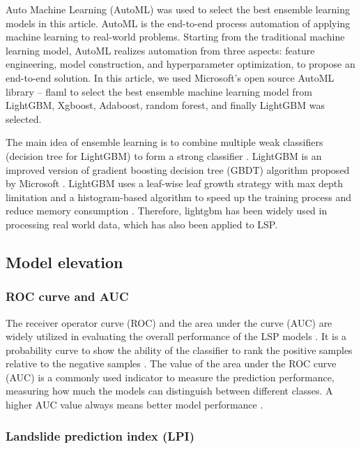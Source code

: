 \documentclass[a4paper,fleqn]{cas-sc}
\begin{document}
Auto Machine Learning (AutoML) was used to select the best ensemble learning models in this article.
AutoML is the end-to-end process automation of applying machine learning to real-world problems.
Starting from the traditional machine learning model, AutoML realizes automation from three aspects: feature engineering, model construction, and hyperparameter optimization, to propose an end-to-end solution.
In this article, we used Microsoft's open source AutoML library -- flaml to select the best ensemble machine learning model from LightGBM, Xgboost, Adaboost, random forest, and finally LightGBM was selected.


The main idea of ensemble learning is to combine multiple weak classifiers (decision tree for LightGBM) to form a strong classifier \citep{Song2018}. 
LightGBM is an improved version of gradient boosting decision tree (GBDT) algorithm proposed by Microsoft \citep{ke2017lightgbm}. 
LightGBM uses a leaf-wise leaf growth strategy with max depth limitation and a histogram-based algorithm to speed up the training process and reduce memory consumption \citep{Gao2021}. 
Therefore, lightgbm has been widely used in processing real world data, which has also been applied to LSP\citep{Song2018,Zhang2022}.

\subsection{Model elevation}
\subsubsection{ROC curve and AUC}

The receiver operator curve (ROC) and the area under the curve (AUC) are widely utilized in evaluating the overall performance of the LSP models \citep{Zhao2021, Gao2021}.
It is a probability curve to show the ability of the classifier to rank the positive samples relative to the negative samples \citep{Gao2021}.
The value of the area under the ROC curve (AUC) is a commonly used indicator to measure the prediction performance, measuring how much the models can distinguish between different classes. 
A higher AUC value always means better model performance \citep{Song2018, Gao2021}.


\subsubsection{Landslide prediction index (LPI)}
\end{document}
